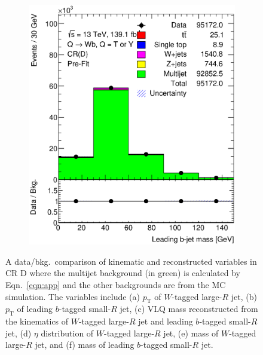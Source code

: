 \begin{figure}[hbt!]
\begin{subfigure}{.35\textwidth}
		\caption{}
		\label{fig:app:cr_d:ljet_m}
	\end{subfigure}\hspace{0.6cm}
	\begin{subfigure}{.35\textwidth}
		\centering
		\includegraphics[width=\linewidth,height=\textheight,keepaspectratio]{CR_D_jet_m.eps}
		\caption{}
		\label{fig:app:cr_d:jet_m}
	\end{subfigure}
	\caption{A data/bkg.\ comparison of kinematic and reconstructed variables in CR D where the multijet background (in green) is calculated by Eqn.\ \ref{eqn:app} and the other backgrounds are from the MC simulation. The variables include (a) $p_{\text{T}}$ of $W$-tagged large-$R$ jet, (b) $p_{\text{T}}$ of leading $b$-tagged small-$R$ jet, (c) VLQ mass reconstructed from the kinematics of $W$-tagged large-$R$ jet and leading $b$-tagged small-$R$ jet, (d) $\eta$ distribution of $W$-tagged large-$R$ jet, (e) mass of $W$-tagged large-$R$ jet, and (f) mass of leading $b$-tagged small-$R$ jet.}
	\label{fig:app:cr_d}
\end{figure}





